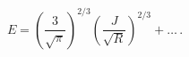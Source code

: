 \begin{equation}
\label{eJs}
E=\left(\frac{3}{\sqrt{\pi}}\right)^{2/3}\left(\frac{J}{\sqrt{R}}\right)^{2/3}+\ldots\,.
\end{equation}

